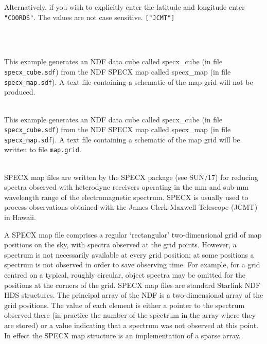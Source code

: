 \documentclass[twoside,11pt]{article}
\newcommand{\htmladdnormallink}[2]{#1}
\newcommand{\htmlref}[2]{#1}
\newcommand{\xref}[3]{#1}
\newlength{\sstexampleslength}
\newcommand{\sstexamples}[1]{
   \goodbreak
   \item[Examples:] \mbox{} \\
   \vspace{-3.5ex}
   \begin{description}
      #1
   \end{description}
}
\newcommand{\sstexamplesubsection}[2]{\sloppy
\item[\parbox{\sstexampleslength}{\ssttt #1}] \mbox{} \vspace{0.5ex}
\\ #2 \vspace{1.0ex}}
\newcommand{\sstdiytopic}[2]{\goodbreak \item[{\hspace{-0.35em}#1\hspace{-0.35em}:}] \mbox{} \\[1.3ex] #2}
\newcommand{\sstexamples}[1]{
   \item[\vspace{0.35ex}\htmlref{Examples:\vspace{-0.5ex}}{app_example}]
      \begin{description}
         #1
      \end{description}
      \\
   }
\newcommand{\sstexamplesubsection}[2]{
   \vspace{-1.0ex} \item[{\ssttt #1}] #2 \vspace{0.2ex}}
\newcommand{\sstdiytopic}[2]{\\ \item[{#1}:]
      \begin{description}
         #2
      \end{description}
   }
\begin{document}
{{{         Alternatively, if you wish to explicitly enter the latitude and
         longitude enter \texttt{"COORDS"}.  The values are not case sensitive.
         \texttt{["JCMT"]}
      }
   }
   \sstexamples{
      \sstexamplesubsection{
         specx2ndf  specx\_map  specx\_cube
      }{
         This example generates an NDF data cube called specx\_cube
         (in file \texttt{specx\_cube.sdf}) from the NDF SPECX map called
         specx\_map (in file \texttt{specx\_map.sdf}).  A text file
         containing a schematic of the map grid will not be produced.
      }
      \sstexamplesubsection{
         specx2ndf  specx\_map  specx\_cube  gridfile=map.grid
      }{
         This example generates an NDF data cube called specx\_cube
         (in file \texttt{specx\_cube.sdf}) from the NDF SPECX map called
         specx\_map (in file \texttt{specx\_map.sdf}).  A text file
         containing a schematic of the map grid will be written to file
         \texttt{map.grid}.
      }
   }
   \sstdiytopic{
      Input and output map formats
   }{
      SPECX map files are written by the SPECX package (see 
      \xref{SUN/17}{sun17}{}) for
      reducing spectra observed with heterodyne receivers operating in
      the mm and sub-mm wavelength range of the electromagnetic
      spectrum.  SPECX is usually used to process observations obtained
      with the \htmladdnormallink{James Clerk Maxwell
      Telescope}{http://www.jach.hawaii.edu/JCMT/index.html} (JCMT) in
      Hawaii.

      A SPECX map file comprises a regular `rectangular' two-dimensional
      grid of map positions on the sky, with spectra observed at the grid
      points.  However, a spectrum is not necessarily available at every
      grid position; at some positions a spectrum is not observed in
      order to save observing time.  For example, for a grid centred on
      a typical, roughly circular, object spectra may be omitted for the
      positions at the corners of the grid.  SPECX map files are standard
      Starlink NDF HDS structures.  The principal array of the NDF is a
      two-dimensional array of the grid positions.  The value of each
      element is either a pointer to the spectrum observed there (in
      practice the number of the spectrum in the array where they are
      stored) or a value indicating that a spectrum was not observed at
      this point.  In effect the SPECX map structure is an implementation
      of a sparse array.

}}
\end{document}
